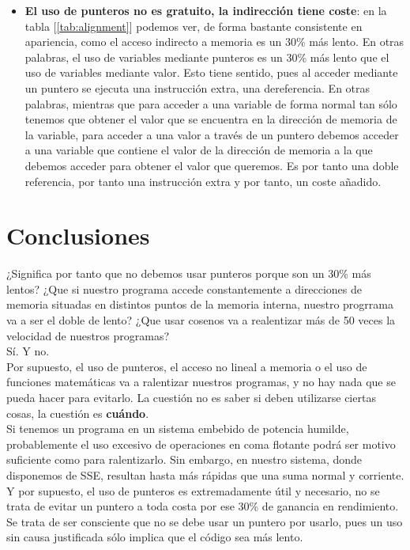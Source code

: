 \begin{itemize}
	\item \textbf{El uso de punteros no es gratuito, la indirección tiene coste}: en la tabla [\ref{tab:alignment}] podemos ver, de forma bastante consistente en apariencia, como el acceso indirecto a memoria es un 30\% más lento. En otras palabras, el uso de variables mediante punteros es un 30\% más lento que el uso de variables mediante valor. Esto tiene sentido, pues al acceder mediante un puntero se ejecuta una instrucción extra, una dereferencia. En otras palabras, mientras que para acceder a una variable de forma normal tan sólo tenemos que obtener el valor que se encuentra en la dirección de memoria de la variable, para acceder a una valor a través de un puntero debemos acceder a una variable que contiene el valor de la dirección de memoria a la que debemos acceder para obtener el valor que queremos. Es por tanto una doble referencia, por tanto una instrucción extra y por tanto, un coste añadido.
\end{itemize}

\section{Conclusiones}

¿Significa por tanto que no debemos usar punteros porque son un 30\% más lentos? ¿Que si nuestro programa accede constantemente a direcciones de memoria situadas en distintos puntos de la memoria interna, nuestro progrrama va a ser el doble de lento? ¿Que usar cosenos va a realentizar más de 50 veces la velocidad de nuestros programas?\\

Sí. Y no.\\

Por supuesto, el uso de punteros, el acceso no lineal a memoria o el uso de funciones matemáticas va a ralentizar nuestros programas, y no hay nada que se pueda hacer para evitarlo. La cuestión no es saber si deben utilizarse ciertas cosas, la cuestión es \textbf{cuándo}.\\

Si tenemos un programa en un sistema embebido de potencia humilde, probablemente el uso excesivo de operaciones en coma flotante podrá ser motivo suficiente como para ralentizarlo. Sin embargo, en nuestro sistema, donde disponemos de SSE, resultan hasta más rápidas que una suma normal y corriente.\\

Y por supuesto, el uso de punteros es extremadamente útil y necesario, no se trata de evitar un puntero a toda costa por ese 30\% de ganancia en rendimiento. Se trata de ser consciente que no se debe usar un puntero por usarlo, pues un uso sin causa justificada sólo implica que el código sea más lento.\\

